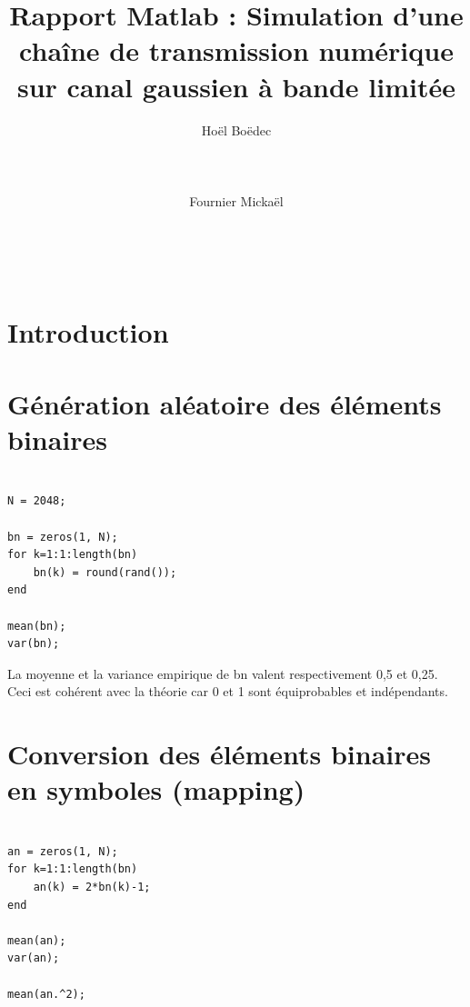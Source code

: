 \documentclass{acm_proc_article-sp}
\begin{document}
\title{Rapport Matlab : Simulation d'une chaîne de transmission numérique sur canal gaussien à bande limitée}

\author{
\alignauthor
Hoël Boëdec\\
       \\
       \\
       \\
\alignauthor
Fournier Mickaël\\
       \\
       \\
       \\
}

\maketitle

\section{Introduction}

\section{Génération aléatoire des éléments binaires}
\begin{lstlisting}

N = 2048;

bn = zeros(1, N);
for k=1:1:length(bn)
    bn(k) = round(rand());
end

mean(bn);
var(bn);
\end{lstlisting}
La moyenne et la variance empirique de bn valent respectivement 0,5 et 0,25. Ceci est cohérent avec la théorie car 0 et 1 sont équiprobables et indépendants.


\section{Conversion des éléments binaires en symboles (mapping)}
\begin{lstlisting}

an = zeros(1, N);
for k=1:1:length(bn)
    an(k) = 2*bn(k)-1;
end

mean(an);
var(an);

mean(an.^2);
\end{lstlisting}
\end{document}
